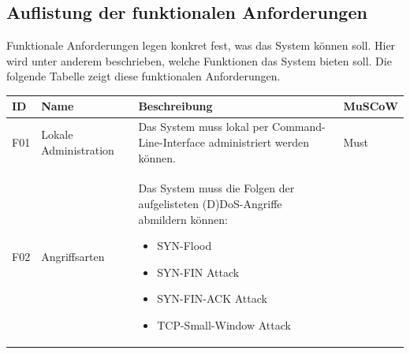 \documentclass[../review_3.tex]{subfiles}
\begin{document}
\subsection{Auflistung der funktionalen Anforderungen}

Funktionale Anforderungen legen konkret fest, was das System können soll. Hier wird unter anderem beschrieben, welche Funktionen das System bieten soll. Die folgende Tabelle zeigt diese funktionalen Anforderungen.

\begin{longtable} [h] {p{1cm} p{4cm} p{7cm} l}
   \toprule
   \textbf{ID}                                                                                                                                                                                                      & \textbf{Name}                                  & \textbf{Beschreibung}                                                                                                                                                                                                                                   & \textbf{MuSCoW} \\ \midrule \endhead
    F01                                                                                                                                                                                                              & Lokale Administration                          & Das System muss lokal per Command-Line-Interface administriert werden können.                                                                                                                                                                           & Must            \\
    F02                                                                                                                                                                                                              & Angriffsarten                                  & Das System muss die Folgen der aufgelisteten (D)DoS-Angriffe abmildern können: \begin{itemize} \setlength{\parskip}{-2pt}
        \item SYN-Flood
        \item SYN-FIN Attack
        \item SYN-FIN-ACK Attack
        \item TCP-Small-Window Attack

\end{itemize}
\end{longtable}
\end{document}
